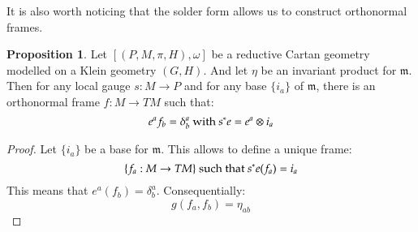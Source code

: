 \documentclass[12pt,a4paper]{report}
\theoremstyle{definition}
\theoremstyle{Theorem}
\newtheorem{Prop}[Def]{Proposition}
\theoremstyle{break}
\theoremstyle{definition}
\begin{document}
	It is also worth noticing that the solder form allows us to construct orthonormal frames.
	\begin{Prop}
		Let $[(P,M,\pi,H),\omega]$ be a reductive Cartan geometry modelled on a Klein geometry $(G,H)$. And let $\eta$ be an invariant product for $\mathfrak{m}$. Then for any local gauge $s:M\rightarrow P$ and for any base $\{i_a\}$ of $\mathfrak{m}$, there is an orthonormal frame $f:M\rightarrow TM$ such that:
		$$e^af_b=\delta^a_b\hbox{ with } s^*e=e^a\otimes i_a$$
	\end{Prop}
	\begin{proof}
		Let $\{i_a\}$ be a base for $\mathfrak{m}$. This allows to define a unique frame:
		$$\{f_a:M\rightarrow TM\} \hbox{ such that }s^*e(f_a)=i_a$$
		This means that $e^a(f_b)=\delta^a_b$. Consequentially:
		$$g(f_a,f_b)=\eta_{ab}$$
	\end{proof}
\end{document}

